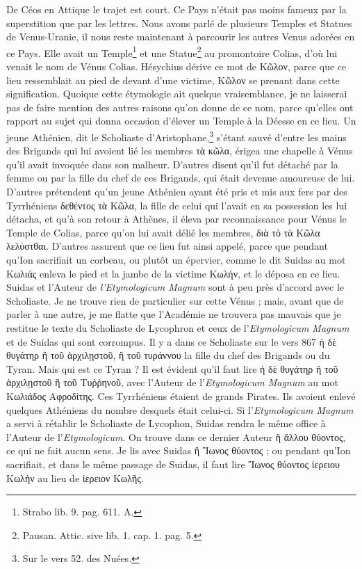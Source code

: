 \documentclass[a4paper, 11pt, oneside, polutonikogreek, french]{article}
\begin{document}
De Céos en Attique le trajet est court. Ce Pays n'était pas moins fameux par la superstition que par les lettres. Nous avons parlé de plusieurs Temples et Statues de Venus-Uranie, il nous reste maintenant à parcourir les autres Venus adorées en ce Pays. Elle avait un Temple\footnote{Strabo lib. 9. pag. 611. A.} et une Statue\footnote{Pausan. Attic. sive lib. 1. cap. 1. pag. 5.} au promontoire Colias, d'où lui venait le nom de Vénus Colias. Hésychius dérive ce mot de Κῶλον, parce que ce lieu ressemblait au pied de devant d'une victime, Κῶλον se prenant dans cette signification. Quoique cette étymologie ait quelque vraisemblance, je ne laisserai pas de faire mention des autres raisons qu'on donne de ce nom, parce qu'elles ont rapport au sujet qui donna occasion d'élever un Temple à la Déesse en ce lieu. Un jeune Athénien, dit le Scholiaste d'Aristophane,\footnote{Sur le vers 52. des Nuées.} s'étant sauvé d'entre les mains des Brigands qui lui avoient lié les membres τὰ κῶλα, érigea une chapelle à Vénus qu'il avait invoquée dans son malheur. D'autres disent qu'il fut détaché par la femme ou par la fille du chef de ces Brigands, qui était devenue amoureuse de lui. D'autres prétendent qu'un jeune Athénien ayant été pris et mis aux fers par des Tyrrhéniens δεθέντος τὰ Κῶλα, la fille de celui qui l'avait en sa possession les lui détacha, et qu'à son retour à Athènes, il éleva par reconnaissance pour Vénus le Temple de Colias, parce qu'on lui avait délié les membres, διὰ τὸ τὰ Κῶλα λελύστθαι. D'autres assurent que ce lieu fut ainsi appelé, parce que pendant qu'Ion sacrifiait un corbeau, ou plutôt un épervier, comme le dit Suidas au mot Κωλιάς enleva le pied et la jambe de la victime Κωλήν, et le déposa en ce lieu. Suidas et l'Auteur de \emph{l'Etymologicum Magnum} sont à peu près d'accord avec le Scholiaste. Je ne trouve rien de particulier sur cette Vénus ; mais, avant que de parler à une autre, je me flatte que l'Académie ne trouvera pas mauvais que je restitue le texte du Scholiaste de Lycophron et ceux de l'\emph{Etymologicum Magnum} et de Suidas qui sont corrompus. Il y a dans ce Scholiaste sur le vers 867 ἡ δὲ θυγάτηρ ἢ τοῦ ἀρχιλῃστοῦ, ἢ τοῦ τυράννου la fille du chef des Brigands ou du Tyran. Mais qui est ce Tyran ? Il est évident qu'il faut lire ἡ δὲ θυγάτηρ ἢ τοῦ ἀρχιλῃστοῦ ἢ τοῦ Τυῤῥηνοῦ, avec l'Auteur de l'\emph{Etymologicum Magnum} au mot Κωλιάδος Αφροδίτης. Ces Tyrrhéniens étaient de grands Pirates. Ils avoient enlevé quelques Athéniens du nombre desquels était celui-ci. Si l'\emph{Etymologicum Magnum} a servi à rétablir le Scholiaste de Lycophon, Suidas rendra le même office à l'Auteur de l'\emph{Etymologicum}. On trouve dans ce dernier Auteur ἢ ἄλλου θύοντος, ce qui ne fait aucun sens. Je lis avec Suidas ἢ Ἲωνος θύοντος ; ou pendant qu'Ion sacrifiait, et dans le même passage de Suidas, il faut lire Ἲωνος θύοντος ἰερειου Κωλὴν au lieu de ἰερειον Κωλῆς.
\end{document}
